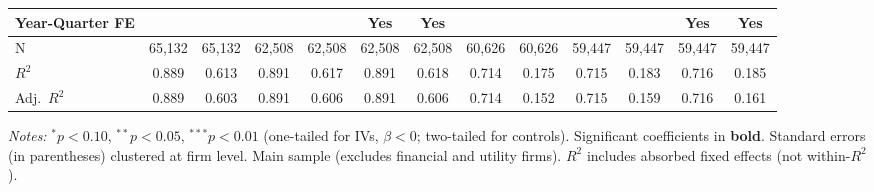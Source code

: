 \begin{landscape}
\begin{table}[H]
\begin{tabular}{lcccccccccccc}
Year-Quarter FE &  &  &  &  & Yes & Yes &  &  &  &  & Yes & Yes \\
\midrule
N & 65,132 & 65,132 & 62,508 & 62,508 & 62,508 & 62,508 & 60,626 & 60,626 & 59,447 & 59,447 & 59,447 & 59,447 \\
$R^2$ & 0.889 & 0.613 & 0.891 & 0.617 & 0.891 & 0.618 & 0.714 & 0.175 & 0.715 & 0.183 & 0.716 & 0.185 \\
Adj.~$R^2$ & 0.889 & 0.603 & 0.891 & 0.606 & 0.891 & 0.606 & 0.714 & 0.152 & 0.715 & 0.159 & 0.716 & 0.161 \\
\bottomrule
\end{tabular}
\begin{minipage}{\linewidth}
\vspace{2pt}\scriptsize
\textit{Notes:} $^{*}p<0.10$, $^{**}p<0.05$, $^{***}p<0.01$ (one-tailed for IVs, $\beta < 0$; two-tailed for controls).
 Significant coefficients in \textbf{bold}.
 Standard errors (in parentheses) clustered at firm level.
 Main sample (excludes financial and utility firms).
 $R^2$ includes absorbed fixed effects (not within-$R^2$).
\end{minipage}
\end{table}
\end{landscape}